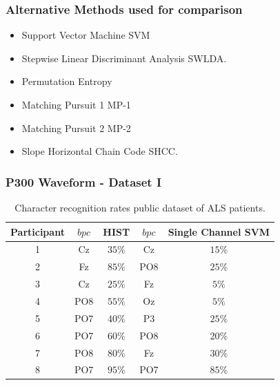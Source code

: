 \documentclass[aspectratio=169]{beamer}
\newcommand\Fontre{\fontsize{16}{16.2}\selectfont}
\begin{document}
\begin{frame}
\frametitle{Alternative Methods used for comparison}
\begin{center}
\begin{itemize}
 \item<1-> \Fontre Support Vector Machine SVM
 \item<2-> \Fontre Stepwise Linear Discriminant Analysis SWLDA.
 \item<3-> \Fontre Permutation Entropy %
 \item<4-> \Fontre Matching Pursuit 1 MP-1 %
 \item<5-> \Fontre Matching Pursuit 2 MP-2
 \item<6-> \Fontre Slope Horizontal Chain Code SHCC.
\end{itemize}
\end{center}
\end{frame} 


\begin{frame}
\frametitle{P300 Waveform - Dataset I}
\begin{center}
\begin{table}[h!]
\caption{Character recognition rates public dataset of ALS patients.}
\centering
\begin{tabular}{c|cc|cc}
\toprule
\textbf{Participant}	&  $bpc$ 	&  HIST &  $bpc$	&  Single Channel SVM \\
\midrule
1     &     Cz   &   $35\%$    &  Cz   & $15\%$   \\
2     &     Fz   &   $85\%$      &  PO8   & $25\%$   \\
3     &     Cz   &   $25\%$    &  Fz   & $5\%$   \\
4     &     PO8 &   $55\%$   &  Oz   & $5\%$    \\
5     &     PO7 &   $40\%$    &  P3   & $25\%$   \\
6     &     PO7 &   $60\%$  &  PO8   & $20\%$    \\
7     &     PO8 &   $80\%$   &  Fz   & $30\%$     \\
8     &     PO7 &   $95\%$     &  PO7   & $85\%$ \\

\end{tabular}
\label{tab:resultsals}
\end{table}
\end{center}
\end{frame} 
\end{document}
